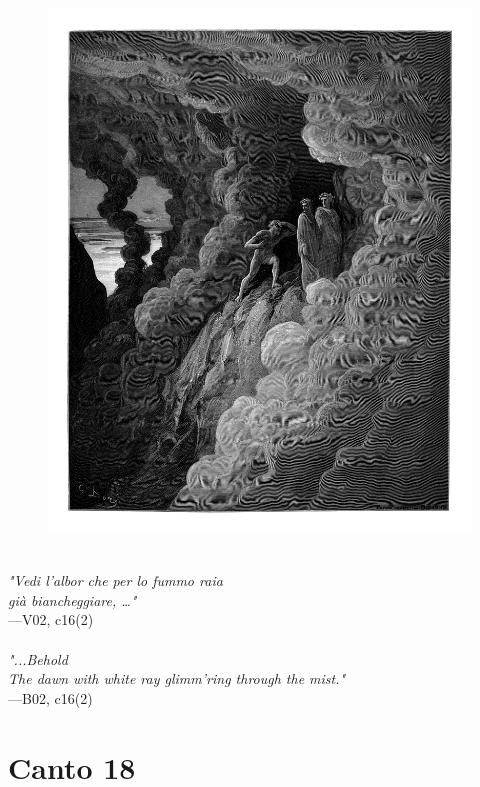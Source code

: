 \documentclass[../Dore_vision.tex]{subfiles}
\begin{document}
\begin{figure}[ht]
\centering
\includegraphics[height=\figsize]{illustrations/book_2/V02, c16(2).jpg}
\end{figure}

\begin{center}
\begin{minipage}{0.8\linewidth}
\textit{\\
"Vedi l’albor che per lo fummo raia\\già biancheggiare, …"} \\
—V02, c16(2) \\~\\
\textit{"...Behold\\The dawn with white ray glimm'ring through the mist."} \\
—B02, c16(2)
\end{minipage}
\end{center}

\newpage

\section{Canto 18}
\end{document}
